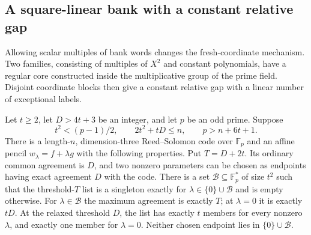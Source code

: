 \subsection{A square-linear bank with a constant relative gap}
\label{subsec:square-linear-block-bank}

Allowing scalar multiples of bank words changes the fresh-coordinate
mechanism.  Two families, consisting of multiples of $X^2$ and constant
polynomials, have a regular core constructed inside the multiplicative
group of the prime field.  Disjoint coordinate blocks then give a
constant relative gap with a linear number of exceptional labels.

\begin{lemma}
\label{lem:finite-square-linear-block-profile}
Let $t\ge2$, let $D>4t+3$ be an integer, and let $p$ be an odd prime.
Suppose
\[
 t^2<(p-1)/2,\qquad
 2t^2+tD\le n,\qquad p>n+6t+1.
\]
There is a length-$n$, dimension-three Reed--Solomon code over
$\mathbb F_p$ and an affine pencil $w_\lambda=f+\lambda g$ with
the following properties.  Put $T=D+2t$.  Its ordinary common
agreement is $D$, and two nonzero parameters can be chosen as
endpoints having exact agreement $D$ with the code.  There is a
set $\mathcal B\subseteq\mathbb F_p^*$ of size $t^2$ such that
the threshold-$T$ list is a singleton exactly for
$\lambda\in\{0\}\cup\mathcal B$ and is empty otherwise.
For $\lambda\in\mathcal B$ the maximum agreement is exactly $T$;
at $\lambda=0$ it is exactly $tD$.
At the relaxed threshold $D$, the list has exactly $t$ members for
every nonzero $\lambda$, and exactly one member for $\lambda=0$.
Neither chosen endpoint lies in $\{0\}\cup\mathcal B$.
\end{lemma}
